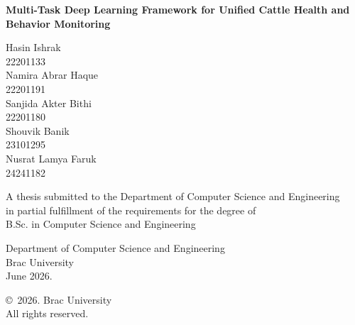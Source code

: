 \begin{titlepage}
\renewcommand*{\thepage}{Title}

    \begin{center} 
        \vspace*{2cm}
        
        {\fontsize{17.28pt}{22pt}\selectfont{Pre-Thesis II Report}
        }
        
        \vspace{0.8cm}
        
        {\fontsize{14pt}{20pt}\selectfont\textbf{Multi-Task Deep Learning Framework for Unified Cattle Health and Behavior Monitoring}
        }
        
        \vspace{0.6cm}
        
        \vspace{0.6cm}
        
        Hasin Ishrak\\
        22201133\\
        \vspace{0.1cm}
        Namira Abrar Haque\\
        22201191\\
        \vspace{0.1cm}
        Sanjida Akter Bithi\\
        22201180\\
        \vspace{0.1cm}
        Shouvik Banik\\
        23101295\\
        \vspace{0.1cm}
        Nusrat Lamya Faruk\\
        24241182

        \vspace{1cm}
        
        A thesis submitted to the Department of Computer Science and Engineering\\
        in partial fulfillment of the requirements for the degree of\\
        B.Sc. in Computer Science and Engineering

        
        \vspace{1cm}
        
        Department of Computer Science and Engineering\\
        Brac University\\
        June 2026.
        
        \vspace{1cm}
        
        \copyright\ 2026. Brac University\\
        All rights reserved.
    
    \end{center}

\end{titlepage}
